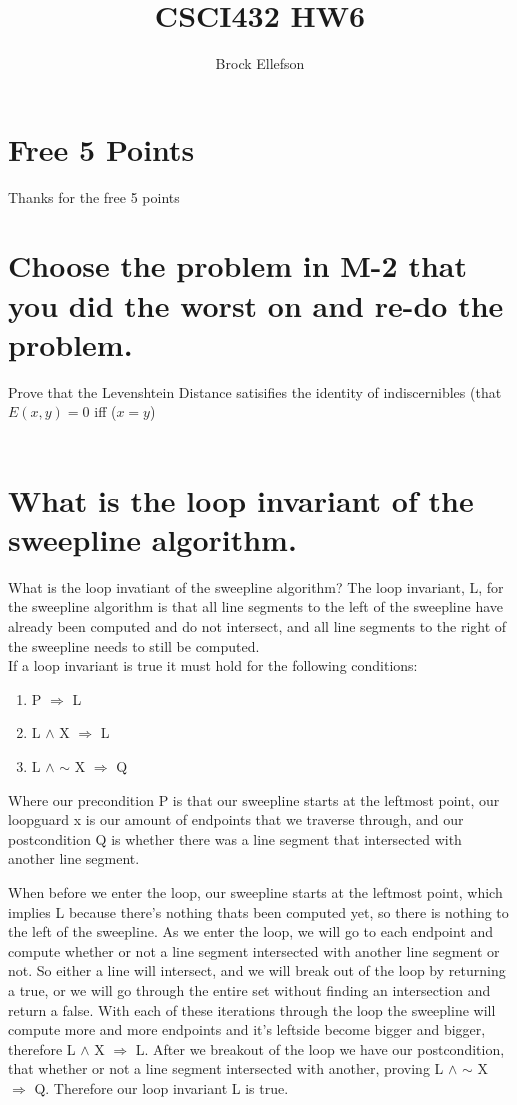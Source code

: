 \documentclass[10pt,a4paper]{article}
\author{Brock Ellefson}
\title{CSCI432 HW6}
\begin{document}
\maketitle
\section{Free 5 Points}
Thanks for the free 5 points
\section{Choose the problem in M-2 that you did the worst on and re-do the problem.}
Prove that the Levenshtein Distance satisifies the identity of indiscernibles (that $E(x,y) = 0$ iff ($x=y$)\\
\\
\section{What is the loop invariant of the sweepline algorithm.}

What is the loop invatiant of the sweepline algorithm?
The loop invariant, L, for the sweepline algorithm is that all line segments to the left of the sweepline have already been computed and do not intersect, and all line segments to the right of the sweepline needs to still be computed.\\
If a loop invariant is true it must hold for the following conditions:
\begin{enumerate}
  \item P $\Rightarrow$ L 
  \item L $\wedge$ X $\Rightarrow$ L
  \item L $\wedge$ $\sim$ X $\Rightarrow$ Q
\end{enumerate}

Where our precondition P is that our sweepline starts at the leftmost point, our loopguard x is our amount of endpoints that we traverse through, and our postcondition Q is whether there was a line segment that intersected with another line segment.

When before we enter the loop, our sweepline starts at the leftmost point, which implies L because there's nothing thats been computed yet, so there is nothing to the left of the sweepline. As we enter the loop, we will go to each endpoint and compute whether or not a line segment intersected with another line segment or not. So either a line will intersect, and we will break out of the loop by returning a true, or we will go through the entire set without finding an intersection and return a false. With each of these iterations through the loop the sweepline will compute more and more endpoints and it's leftside become bigger and bigger, therefore 
L $\wedge$ X $\Rightarrow$ L. After we breakout of the loop we have our postcondition, that whether or not a line segment intersected with another, proving L $\wedge$ $\sim$ X $\Rightarrow$ Q. Therefore our loop invariant L is true.
\end{document}
